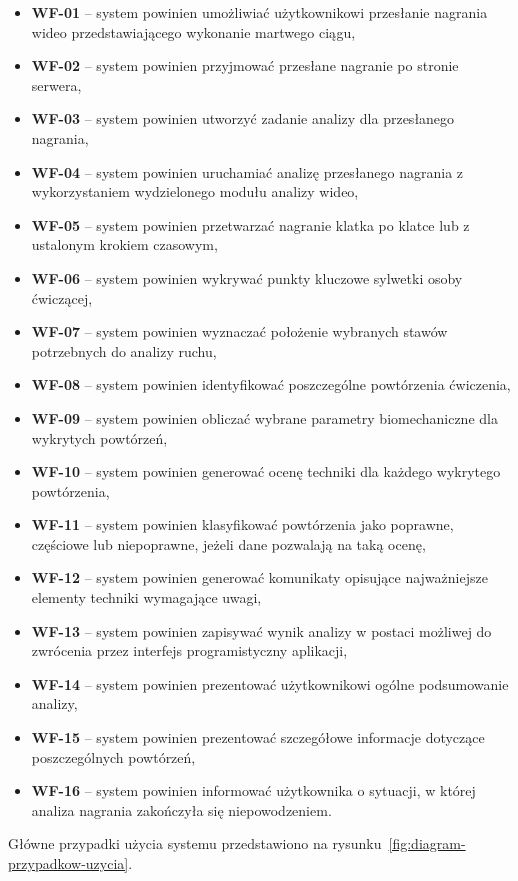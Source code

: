 \begin{itemize}
\item \textbf{WF-01} -- system powinien umożliwiać użytkownikowi przesłanie nagrania wideo przedstawiającego wykonanie martwego ciągu,
\item \textbf{WF-02} -- system powinien przyjmować przesłane nagranie po stronie serwera,
\item \textbf{WF-03} -- system powinien utworzyć zadanie analizy dla przesłanego nagrania,
\item \textbf{WF-04} -- system powinien uruchamiać analizę przesłanego nagrania z wykorzystaniem wydzielonego modułu analizy wideo,
\item \textbf{WF-05} -- system powinien przetwarzać nagranie klatka po klatce lub z ustalonym krokiem czasowym,
\item \textbf{WF-06} -- system powinien wykrywać punkty kluczowe sylwetki osoby ćwiczącej,
\item \textbf{WF-07} -- system powinien wyznaczać położenie wybranych stawów potrzebnych do analizy ruchu,
\item \textbf{WF-08} -- system powinien identyfikować poszczególne powtórzenia ćwiczenia,
\item \textbf{WF-09} -- system powinien obliczać wybrane parametry biomechaniczne dla wykrytych powtórzeń,
\item \textbf{WF-10} -- system powinien generować ocenę techniki dla każdego wykrytego powtórzenia,
\item \textbf{WF-11} -- system powinien klasyfikować powtórzenia jako poprawne, częściowe lub niepoprawne, jeżeli dane pozwalają na taką ocenę,
\item \textbf{WF-12} -- system powinien generować komunikaty opisujące najważniejsze elementy techniki wymagające uwagi,
\item \textbf{WF-13} -- system powinien zapisywać wynik analizy w postaci możliwej do zwrócenia przez interfejs programistyczny aplikacji,
\item \textbf{WF-14} -- system powinien prezentować użytkownikowi ogólne podsumowanie analizy,
\item \textbf{WF-15} -- system powinien prezentować szczegółowe informacje dotyczące poszczególnych powtórzeń,
\item \textbf{WF-16} -- system powinien informować użytkownika o sytuacji, w której analiza nagrania zakończyła się niepowodzeniem.
\end{itemize}

Główne przypadki użycia systemu przedstawiono na rysunku~\ref{fig:diagram-przypadkow-uzycia}.

